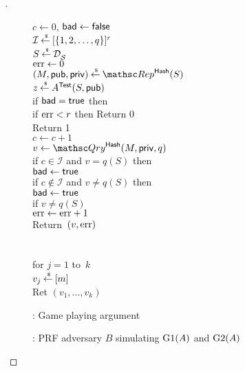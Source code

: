 \begin{proof}[]
\begin{figure}
{{$c\gets 0$, $\mathsf{bad} \gets \mathsf{false}$\\
$\mathcal{I}{\:\stackrel{{\scriptscriptstyle \hspace{0.2em}\$}} {\leftarrow}\:} [\{1,2,\ldots,q\}]^r$\\
$S {\:\stackrel{{\scriptscriptstyle \hspace{0.2em}\$}} {\leftarrow}\:} \mathcal{D}_{{\cal S}}^{}$\\
$\mathrm{err} \gets 0$\\
$(M,\pubaux,\privaux) \getsr \Rep^{\HashOracle}(S)$\\
$z {\:\stackrel{{\scriptscriptstyle \hspace{0.2em}\$}} {\leftarrow}\:} A^{\mathsf{Test}}(S,{\sf pub})$\\
if $\mathsf{bad} = \mathsf{true}$ then \\
if $\mathrm{err}  < r$ then Return 0\\
Return 1
}
%
{
\\
$c \gets c+1$\\
$v \gets \Qry^{\HashOracle}(M,\privaux,q)$\\
if $c \in \mathcal{I}$ and $v = q(S)$ then \\
\nudge $\mathsf{bad} \gets \mathsf{true}$ \\
if $c \not\in \mathcal{I}$ and $v \neq q(S)$ then \\
\nudge $\mathsf{bad} \gets \mathsf{true}$\\
if $v \neq q(S)$\\
\nudge $\mathrm{err} \gets\mathrm{err} +1$\\
Return~$(v,\mathrm{err} )$\\\\
%
\\
for $j = 1$ to~$k$\\
\nudge $v_j {\:\stackrel{{\scriptscriptstyle \hspace{0.2em}\$}} {\leftarrow}\:} [m]$\\
Ret $\left(v_1,\ldots,v_k\right)$
}
}
\caption{: Game playing argument}\label{fig:2TGame}
\end{figure}

\begin{figure}
\centering
{}
\caption{: PRF adversary $B$ simulating $\text{G1}(A)$ and $\text{G2}(A)$} \label{fig:2TD}
\end{figure}	


\end{proof}

